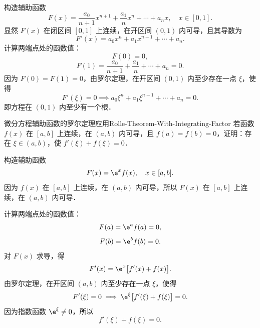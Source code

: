 \begin{myproof}
    构造辅助函数
    \begin{equation}
        F(x) = \frac{a_0}{n+1} x^{n+1} + \frac{a_1}{n} x^n + \cdots + a_n x, \quad x \in [0, 1].
    \end{equation}
    显然 $F(x)$ 在闭区间 $[0, 1]$ 上连续，在开区间 $(0, 1)$ 内可导，且其导数为
    \begin{equation}
        F'(x) = a_0 x^n + a_1 x^{n-1} + \cdots + a_n.
    \end{equation}
    计算两端点处的函数值：
    \begin{equation}
        F(0) = 0,
    \end{equation}
    \begin{equation}
        F(1) = \frac{a_0}{n+1} + \frac{a_1}{n} + \cdots + a_n = 0.
    \end{equation}
    因为 $F(0) = F(1) = 0$，由罗尔定理，在开区间 $(0, 1)$ 内至少存在一点 $\xi$，使得
    \begin{equation}
        F'(\xi) = 0 \implies a_0 \xi^n + a_1 \xi^{n-1} + \cdots + a_n = 0.
    \end{equation}
    即方程在 $(0, 1)$ 内至少有一个根．
\end{myproof}

\begin{problem}{微分方程辅助函数的罗尔定理应用}{Rolle-Theorem-With-Integrating-Factor}
    若函数 $f(x)$ 在 $[a, b]$ 上连续，在 $(a, b)$ 内可导，且 $f(a) = f(b) = 0$，证明：存在 $\xi \in (a, b)$，使 $f'(\xi) + f(\xi) = 0$．
\end{problem}

\begin{myproof}
    构造辅助函数
    \begin{equation}
        F(x) = \e^x f(x), \quad x \in [a, b].
    \end{equation}
    因为 $f(x)$ 在 $[a, b]$ 上连续，在 $(a, b)$ 内可导，所以 $F(x)$ 在 $[a, b]$ 上连续，在 $(a, b)$ 内可导．

    计算两端点处的函数值：
    \begin{equation}
        F(a) = \e^a f(a) = 0,
    \end{equation}
    \begin{equation}
        F(b) = \e^b f(b) = 0.
    \end{equation}
    对 $F(x)$ 求导，得
    \begin{equation}
        F'(x) = \e^x \bigl[ f'(x) + f(x) \bigr].
    \end{equation}
    由罗尔定理，在开区间 $(a, b)$ 内至少存在一点 $\xi$，使得
    \begin{equation}
        F'(\xi) = 0 \implies \e^\xi \bigl[ f'(\xi) + f(\xi) \bigr] = 0.
    \end{equation}
    因为指数函数 $\e^\xi \neq 0$，所以
    \begin{equation}
        f'(\xi) + f(\xi) = 0.
    \end{equation}
\end{myproof}

